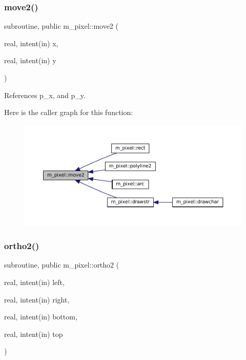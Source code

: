 \subsubsection{\texorpdfstring{move2()}{move2()}}
{\footnotesize\ttfamily subroutine, public m\+\_\+pixel\+::move2 (\begin{DoxyParamCaption}\item[{real, intent(in)}]{x,  }\item[{real, intent(in)}]{y }\end{DoxyParamCaption})}



References p\+\_\+x, and p\+\_\+y.

Here is the caller graph for this function\+:
\nopagebreak
\begin{figure}[H]
\begin{center}
\leavevmode
\includegraphics[width=350pt]{namespacem__pixel_ab5d4dc474ff84dc0f3f35f4a395979e0_icgraph}
\end{center}
\end{figure}
\mbox{\label{namespacem__pixel_a80dece6adac704024a5a76efee697770}} 
\subsubsection{\texorpdfstring{ortho2()}{ortho2()}}
{\footnotesize\ttfamily subroutine, public m\+\_\+pixel\+::ortho2 (\begin{DoxyParamCaption}\item[{real, intent(in)}]{left,  }\item[{real, intent(in)}]{right,  }\item[{real, intent(in)}]{bottom,  }\item[{real, intent(in)}]{top }\end{DoxyParamCaption})}



